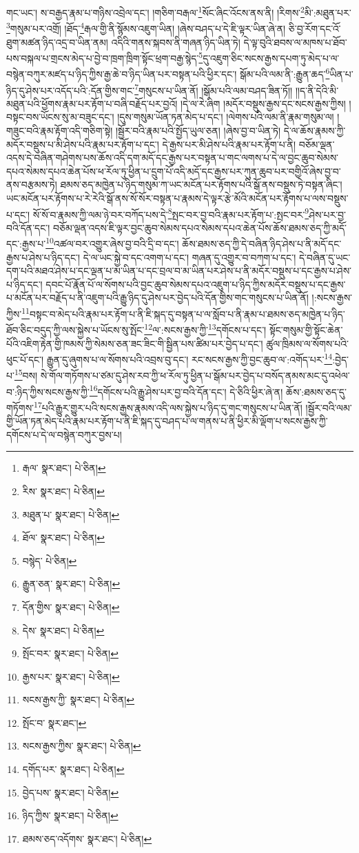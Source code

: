གང་ཡང་། ས་བརྒྱད་རྣམ་པ་གཉིས་འབྲེལ་དང་། །གཅིག་བརྒལ་\footnote{རྒལ་  སྣར་ཐང་།  པེ་ཅིན། }སོང་ཞིང་འོངས་ནས་ནི། །རིགས་\footnote{རིས་  སྣར་ཐང་།  པེ་ཅིན། }མི་:མཐུན་པར་\footnote{མཐུན་པ་  སྣར་ཐང་།  པེ་ཅིན། }གསུམ་པར་འགྲོ། །ཐོད་\footnote{ཐོལ་  སྣར་ཐང་།  པེ་ཅིན། }རྒལ་གྱི་ནི་སྙོམས་འཇུག་ཡིན། །ཞེས་བཤད་པ་དེ་ཇི་ལྟར་ཡིན་ཞེ་ན། ཅི་བྱ་རོག་དང་འོ་ཐུག་མཚན་ཉིད་འདྲ་བ་ཡིན་ནམ། འདིའི་གནས་སྐབས་ནི་གཞན་ཉིད་ཡིན་ཏེ། དེ་ལྟ་བུའི་ཐབས་ལ་མཁས་པ་ཐོབ་པས་བསྐལ་པ་གྲངས་མེད་པ་བྱེ་བ་ཁྲག་ཁྲིག་སྟོང་ཕྲག་བརྒྱ་སྙེད་\footnote{བསྙེད་  པེ་ཅིན། }དུ་འཇུག་ཅིང་སངས་རྒྱས་དཔག་ཏུ་མེད་པ་ལ་བསྙེན་བཀུར་མཛད་པ་ཉིད་ཀྱིས་རྒྱ་ཆེ་བ་ཉིད་ཡིན་པར་བསྟན་པའི་ཕྱིར་དང་། སྒོམ་པའི་ལམ་ནི་:རྒྱུན་ཆད་\footnote{རྒྱུན་ཅན་  སྣར་ཐང་།  པེ་ཅིན། }ཡིན་པ་ཉིད་དུ་ཤེས་པར་འདོད་པའི་:དོན་གྱིས་གང་\footnote{དོན་གྱིས་  སྣར་ཐང་།  པེ་ཅིན། }གསུངས་པ་ཡིན་ནོ། །སྒོམ་པའི་ལམ་བཤད་ཟིན་ཏོ།། །།ད་ནི་དེའི་མི་མཐུན་པའི་ཕྱོགས་རྣམ་པར་རྟོག་པ་བཞི་བརྗོད་པར་བྱའོ། །དེ་ལ་རེ་ཞིག །མདོར་བསྡུས་རྒྱས་དང་སངས་རྒྱས་ཀྱིས། །བསྟང་བས་ཡོངས་སུ་མ་བཟུང་དང་། །དུས་གསུམ་ཡོན་ཏན་མེད་པ་དང་། །ལེགས་པའི་ལམ་ནི་རྣམ་གསུམ་ལ། །གཟུང་བའི་རྣམ་རྟོག་འདི་གཅིག་སྟེ། །སྦྱོར་བའི་རྣམ་པའི་སྤྱོད་ཡུལ་ཅན། །ཞེས་བྱ་བ་ཡིན་ཏེ། དེ་ལ་ཆོས་རྣམས་ཀྱི་མདོར་བསྡུས་པ་མི་ཤེས་པའི་རྣམ་པར་རྟོག་པ་དང་། དེ་རྒྱས་པར་མི་ཤེས་པའི་རྣམ་པར་རྟོག་པ་ནི། བཅོམ་ལྡན་འདས་དེ་བཞིན་གཤེགས་པས་ཆོས་འདི་དག་མདོ་དང་རྒྱས་པར་བསྟན་པ་གང་ལགས་པ་དེ་ལ་བྱང་ཆུབ་སེམས་དཔའ་སེམས་དཔའ་ཆེན་པོས་ཕ་རོལ་ཏུ་ཕྱིན་པ་དྲུག་པོ་འདི་མདོ་དང་རྒྱས་པར་ཀུན་ཆུབ་པར་བགྱིའོ་ཞེས་བྱ་བ་ནས་བརྩམས་ཏེ། ཐམས་ཅད་མཁྱེན་པ་ཉིད་གསུམ་ཀ་ཡང་མངོན་པར་རྟོགས་པའི་སྒོ་ནས་བསྡུས་ཏེ་བསྟན་ཞིང་། ཡང་མངོན་པར་རྟོགས་པ་རེ་རེའི་སྒོ་ནས་སོ་སོར་བསྟན་པ་རྣམས་དེ་ལྟར་རྩེ་མོའི་མངོན་པར་རྟོགས་པ་ལས་བསྡུས་པ་དང་། སོ་སོ་བ་རྣམས་ཀྱི་ལམ་ཉེ་བར་བཀོད་པས་དེ་\footnote{དེས་  སྣར་ཐང་།  པེ་ཅིན། }སྤང་བར་བྱ་བའི་རྣམ་པར་རྟོག་པ་:སྤང་བར་\footnote{སྤོང་བར་  སྣར་ཐང་།  པེ་ཅིན། }ཤེས་པར་བྱ་བའི་དོན་དང་། བཅོམ་ལྡན་འདས་ཇི་ལྟར་བྱང་ཆུབ་སེམས་དཔའ་སེམས་དཔའ་ཆེན་པོས་ཆོས་ཐམས་ཅད་ཀྱི་མདོ་དང་:རྒྱས་པ་\footnote{རྒྱས་པར་  སྣར་ཐང་།  པེ་ཅིན། }འཚལ་བར་འགྱུར་ཞེས་བྱ་བའི་དྲི་བ་དང་། ཆོས་ཐམས་ཅད་ཀྱི་དེ་བཞིན་ཉིད་ཤེས་པ་ནི་མདོ་དང་རྒྱས་པ་ཤེས་པ་ཉིད་དང་། དེ་ལ་ཡང་སྐྱེ་བ་དང་འགག་པ་དང་། གཞན་དུ་འགྱུར་བ་བཀག་པ་དང་། དེ་བཞིན་དུ་ཡང་དག་པའི་མཐའ་ཤེས་པ་དང་ལྡན་པ་མ་ཡིན་པ་དང་བྲལ་བ་མ་ཡིན་པར་ཤེས་པ་ནི་མདོར་བསྡུས་པ་དང་རྒྱས་པ་ཤེས་པ་ཉིད་དང་། དབང་པོ་རྣོན་པོ་ལ་སོགས་པའི་བྱང་ཆུབ་སེམས་དཔའ་འཇུག་པ་ཉིད་ཀྱིས་མདོར་བསྡུས་པ་དང་རྒྱས་པ་མངོན་པར་བརྗོད་པ་ནི་འཇུག་པའི་རྒྱུ་ཉིད་དུ་ཤེས་པར་བྱེད་པའི་དོན་གྱིས་གང་གསུངས་པ་ཡིན་ནོ། །:སངས་རྒྱས་ཀྱིས་\footnote{སངས་རྒྱས་ཀྱི་  སྣར་ཐང་།  པེ་ཅིན། }བསྟང་བ་མེད་པའི་རྣམ་པར་རྟོག་པ་ནི་ཇི་སྐད་དུ་བསྟན་པ་ལ་སློབ་པ་ནི་རྣམ་པ་ཐམས་ཅད་མཁྱེན་པ་ཉིད་ཐོབ་ཅིང་བདུད་ཀྱི་ལས་སྐྱེས་པ་ཡོངས་སུ་སྤོང་\footnote{སྤོང་བ་  སྣར་ཐང་། }ལ་:སངས་རྒྱས་ཀྱི་\footnote{སངས་རྒྱས་ཀྱིས་  སྣར་ཐང་།  པེ་ཅིན། }དགོངས་པ་དང་། སྟོང་གསུམ་གྱི་སྟོང་ཆེན་པོའི་འཇིག་རྟེན་གྱི་ཁམས་ཀྱི་སེམས་ཅན་ཟང་ཟིང་གི་སྦྱིན་པས་ཚིམ་པར་བྱེད་པ་དང་། ཚུལ་ཁྲིམས་ལ་སོགས་པའི་ཕུང་པོ་དང་། རྒྱུན་དུ་ཞུགས་པ་ལ་སོགས་པའི་འབྲས་བུ་དང་། རང་སངས་རྒྱས་ཀྱི་བྱང་ཆུབ་ལ་:འགོད་པར་\footnote{དགོད་པར་  སྣར་ཐང་།  པེ་ཅིན། }:བྱེད་པ་\footnote{བྱེད་པས་  སྣར་ཐང་།  པེ་ཅིན། }བས། སེ་གོལ་གཏོགས་པ་ཙམ་དུ་ཤེས་རབ་ཀྱི་ཕ་རོལ་ཏུ་ཕྱིན་པ་སྒོམ་པར་བྱེད་པ་བསོད་ནམས་མང་དུ་འཕེལ་བ་:ཉིད་ཀྱིས་སངས་རྒྱས་ཀྱི་\footnote{ཉིད་ཀྱིས་  སྣར་ཐང་།  པེ་ཅིན། }དགོངས་པའི་རྒྱུ་ཤེས་པར་བྱ་བའི་དོན་དང་། དེ་ཅིའི་ཕྱིར་ཞེ་ན། ཆོས་:ཐམས་ཅད་དུ་གཏོགས་\footnote{ཐམས་ཅད་འདོགས་  སྣར་ཐང་།  པེ་ཅིན། }པའི་རྒྱུར་གྱུར་པའི་སངས་རྒྱས་རྣམས་འདི་ལས་སྐྱེས་པ་ཉིད་དུ་གང་གསུངས་པ་ཡིན་ནོ། །སྦྱོར་བའི་ལམ་གྱི་ཡོན་ཏན་མེད་པའི་རྣམ་པར་རྟོག་པ་ནི་ཇི་སྐད་དུ་བཤད་པ་ལ་གནས་པ་ནི་ཕྱིར་མི་ལྡོག་པ་སངས་རྒྱས་ཀྱི་དགོངས་པ་དེ་ལ་བསྙེན་བཀུར་བྱས་པ། 